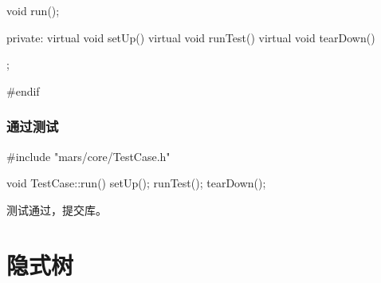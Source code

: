 \begin{content}
\begin{leftbar}
\begin{c++}[caption={\ttfamily{include/mars/core/TestCase.h}}]
{  void run();

private:
  virtual void setUp() {}
  virtual void runTest() {}
  virtual void tearDown() {}
};

#endif
  \end{c++}
\end{leftbar}

\subsubsection{通过测试}

\begin{leftbar}
 \begin{c++}[caption={\ttfamily{src/mars/core/TestCase.cc}}]
#include "mars/core/TestCase.h"

void TestCase::run() {
  setUp();
  runTest();
  tearDown();
}
 \end{c++}
\end{leftbar}

测试通过，提交库。

\end{content}

\section{隐式树}

